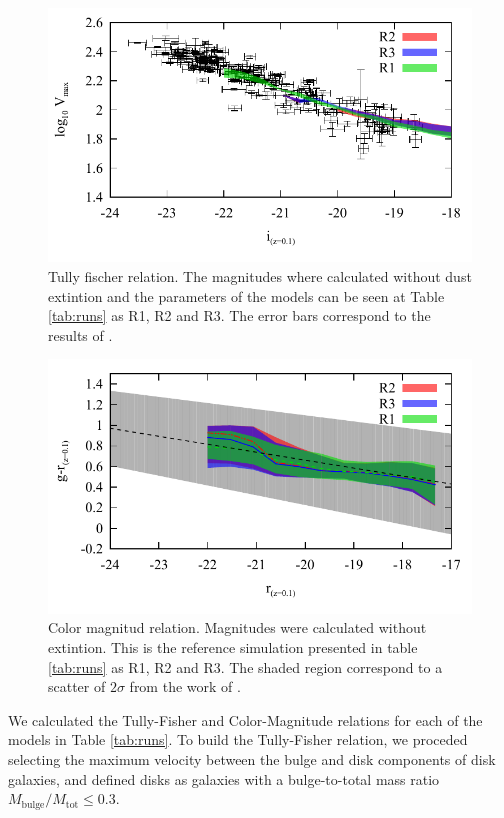 \documentclass[usenatbib]{mn2e}
\begin{document}
\begin{figure}
\centering
 \includegraphics[scale=0.68]{figures/tests/T_F-disk-velmax.pdf}
\caption{ Tully fischer relation. The magnitudes where calculated without dust extintion and the parameters of the models can be seen at Table \ref{tab:runs} 
 as R1, R2 and R3. The error bars correspond to the results of \citet{2007AJ....134..945P}.\label{fig:T-F-diagram}}
\end{figure}
\begin{figure}
\centering
 \includegraphics[scale=0.68]{figures/tests/Color_Mag.pdf}
\caption{ Color magnitud relation. Magnitudes were calculated without extintion. This is the reference simulation presented in table \ref{tab:runs}  as 
R1, R2 and R3. The shaded region correspond to a scatter of  $2\sigma$ from the work  of \citet{2012MNRAS.423.1583M}.\label{fig:CM-diagram}}
\end{figure}
We calculated the Tully-Fisher and Color-Magnitude relations for each of the models in Table \ref{tab:runs}.  
To build the Tully-Fisher relation, we proceded selecting the maximum velocity between the  bulge and disk components of disk galaxies, and defined
 disks as galaxies  with a bulge-to-total mass ratio $M_{\text{bulge}}/M_{\text{tot}}\le 0.3$. 
\end{document}
